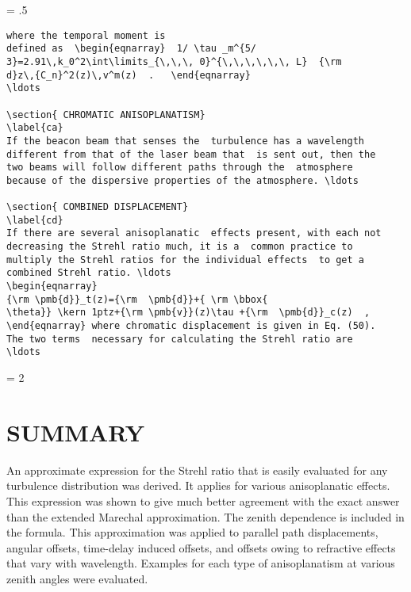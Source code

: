\newpage
\baselineskip = .5\baselineskip  %
\begin{verbatim}
where the temporal moment is
defined as  \begin{eqnarray}  1/ \tau _m^{5/
3}=2.91\,k_0^2\int\limits_{\,\,\, 0}^{\,\,\,\,\,\, L}  {\rm
d}z\,{C_n}^2(z)\,v^m(z)  .   \end{eqnarray}
\ldots

\section{ CHROMATIC ANISOPLANATISM}
\label{ca}
If the beacon beam that senses the  turbulence has a wavelength
different from that of the laser beam that  is sent out, then the
two beams will follow different paths through the  atmosphere
because of the dispersive properties of the atmosphere. \ldots

\section{ COMBINED DISPLACEMENT}
\label{cd}
If there are several anisoplanatic  effects present, with each not
decreasing the Strehl ratio much, it is a  common practice to
multiply the Strehl ratios for the individual effects  to get a
combined Strehl ratio. \ldots
\begin{eqnarray}
{\rm \pmb{d}}_t(z)={\rm  \pmb{d}}+{ \rm \bbox{
\theta}} \kern 1ptz+{\rm \pmb{v}}(z)\tau +{\rm  \pmb{d}}_c(z)  ,
\end{eqnarray} where chromatic displacement is given in Eq. (50).
The two terms  necessary for calculating the Strehl ratio are
\ldots

\end{verbatim}
\newpage
\baselineskip = 2\baselineskip  %


\section{ SUMMARY}
\label{Su}
An approximate expression for the Strehl ratio that is  easily
evaluated for any turbulence distribution was derived.  It  applies
for various anisoplanatic effects.  This expression was shown to
give much better agreement with the exact answer than the extended
Marechal approximation.  The zenith dependence is included in the
formula.  This approximation was applied to parallel path
displacements,  angular offsets, time-delay induced offsets, and
offsets owing to  refractive effects that vary with wavelength.
Examples for each type of  anisoplanatism at various zenith angles
were evaluated.

